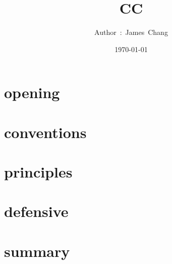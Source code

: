 

\title{CC}
\author{ {\Biohazard} \hspace{1.5mm} \hspace{1.5mm} Author\ :\ James\ Chang}
\date{\today}


\large

\tableofcontents

\chapter{opening}





\chapter{conventions}







\chapter{principles}


\chapter{defensive}






\chapter{summary}




